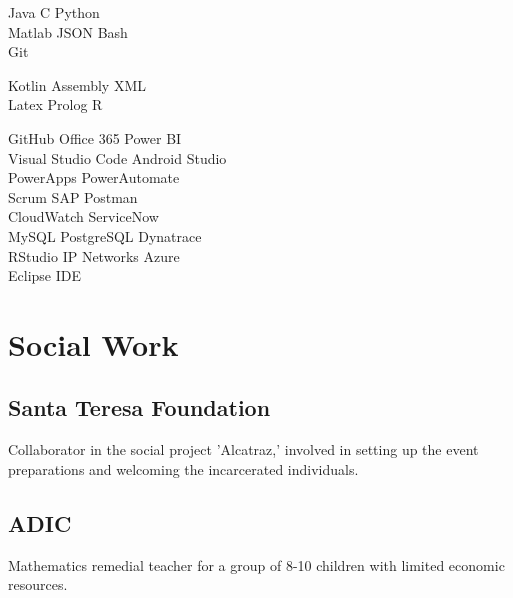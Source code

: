\documentclass[]{single-page-resume}
\begin{document}
\begin{minipage}[t]{0.3\textwidth}
\begin{comment}
\location{\textbf{Daily use:}}
SQL  \textbullet{} R  \textbullet{} \LaTeX \\
Microsoft Data Platform  \\
markdown\textbullet{} bash \textbullet{} JSON
 \sectionsep
\end{comment}
Java \textbullet{} C \textbullet{} Python\\
Matlab \textbullet{} JSON \textbullet{} Bash\\
Git
\sectionsep

Kotlin \textbullet{} Assembly  \textbullet{} XML \\
Latex \textbullet{} Prolog \textbullet{} R \\
\sectionsep

GitHub \textbullet{} Office 365 \textbullet{} Power BI \\
Visual Studio Code \textbullet{} Android Studio  \\
PowerApps \textbullet{} PowerAutomate \\
Scrum \textbullet{} SAP \textbullet{} Postman\\
CloudWatch \textbullet{} ServiceNow \\
MySQL \textbullet{} PostgreSQL \textbullet{} Dynatrace \\
RStudio \textbullet{} IP Networks \textbullet{} Azure \\
Eclipse IDE 
\sectionsep

\section{Social Work}
\subsection{Santa Teresa Foundation}
Collaborator in the social project 'Alcatraz,' involved in setting up the event preparations and welcoming the incarcerated individuals.
\sectionsep
\subsection{ADIC}
Mathematics remedial teacher for a group of 8-10 children with limited economic resources.


%
%

\end{minipage} 
\end{document}
